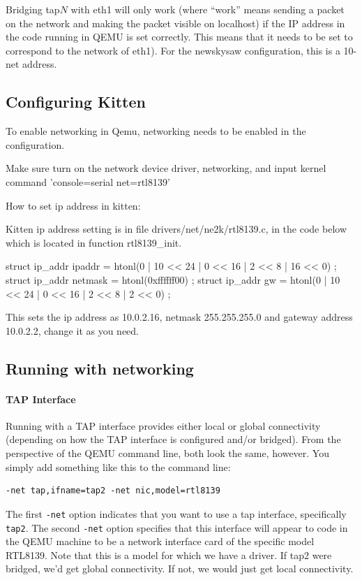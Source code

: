 \documentclass[11pt]{article}
\begin{document}
Bridging tap$N$ with eth1 will only work (where ``work'' means sending
a packet on the network and making the packet visible on localhost) if
the IP address in the code running in QEMU is set correctly.  This
means that it needs to be set to correspond to the network of eth1).  
For the newskysaw configuration, this is a 10-net address.


\subsection{Configuring Kitten}

To enable networking in Qemu, networking needs to be enabled in the
configuration.

Make sure turn on the network device driver, networking, and input
kernel command 'console=serial net=rtl8139'

How to set ip address in kitten:

Kitten ip address setting is in file drivers/net/ne2k/rtl8139.c, in
the code below which is located in function rtl8139\_init.

  struct ip\_addr ipaddr = { htonl(0 | 10 << 24 | 0 << 16 | 2 << 8 | 16 << 0) }; 
  struct ip\_addr netmask = { htonl(0xffffff00) }; 
  struct ip\_addr gw = { htonl(0 | 10 << 24 | 0 << 16 | 2 << 8 | 2 << 0) };

This sets the ip address as 10.0.2.16, netmask 255.255.255.0 and gateway address 10.0.2.2, change it as you need.


\subsection{Running with networking}

\paragraph*{TAP Interface}
Running with a TAP interface provides either local or global
connectivity (depending on how the TAP interface is configured and/or
bridged).  From the perspective of the QEMU command line, both look
the same, however.  You simply add something like this to the command
line:
\begin{verbatim}
-net tap,ifname=tap2 -net nic,model=rtl8139
\end{verbatim}
The first \verb.-net. option indicates that you want to use a tap
interface, specifically \verb.tap2..   The second \verb.-net. option
specifies that this interface will appear to code in the QEMU machine
to be a network interface card of the specific model RTL8139.  Note
that this is a model for which we have a driver.  If tap2 were
bridged, we'd get global connectivity.  If not, we would just get
local connectivity.  
\end{document}
